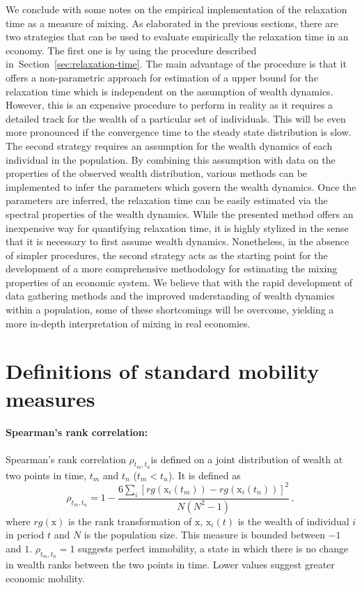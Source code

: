 \documentclass[11pt]{article}
\newcommand{\Sref}[1]{Section~\ref{sec:#1}}
\newcommand{\be}{\begin{equation}}
\newcommand{\ee}{\end{equation}}
\numberwithin{equation}{section}
\begin{document}
We conclude with some notes on the empirical implementation of the relaxation time as a measure of mixing. As elaborated in the previous sections, there are two strategies that can be used to evaluate empirically the relaxation time in an economy. The first one is by using the procedure described in~\Sref{relaxation-time}. The main advantage of the procedure is that it offers a non-parametric approach for estimation of a upper bound for the relaxation time which is independent on the assumption of wealth dynamics. However, this is an expensive procedure to perform in reality as it requires a detailed track for the wealth of a particular set of individuals. This will be even more pronounced if the convergence time to the steady state distribution is slow. The second strategy requires an assumption for the wealth dynamics of each individual in the population. By combining this assumption with data on the properties of the observed wealth distribution, various methods can be implemented to infer the parameters which govern the wealth dynamics. Once the parameters are inferred, the relaxation time can be easily estimated via the spectral properties of the wealth dynamics. While the presented method offers an inexpensive way for quantifying relaxation time, it is highly stylized in the sense that it is necessary to first assume wealth dynamics. Nonetheless, in the absence of simpler procedures, the second strategy acts as the starting point for the development of a more comprehensive methodology for estimating the mixing properties of an economic system. We believe that with the rapid development of data gathering methods and the improved understanding of wealth dynamics within a population, some of these shortcomings will be overcome, yielding a more in-depth interpretation of mixing in real economies.


%

\clearpage

\appendix

\section{Definitions of standard mobility measures}\label{sec:standard-mobility-measures}

\paragraph{Spearman's rank correlation:} Spearman's rank correlation $\rho_{t_m,t_n}$is defined on a joint distribution of wealth at two points in time, $t_m$ and $t_n$ ($t_m < t_n$). It is defined as
%
\be
    \rho_{t_m,t_n} = 1 - \frac{6\sum_i \left[rg\left(\mathrm{x}_i\left(t_m\right)\right) - rg\left(\mathrm{x}_i\left(t_n\right)\right)\right]^2}{N\left(N^2-1\right)}\,,
\ee
%
where $rg(\mathrm{x})$ is the rank transformation of $\mathrm{x}$, $\mathrm{x}_i(t)$ is the wealth of individual $i$ in period $t$ and $N$ is the population size. This measure is bounded between $-1$ and $1$. $\rho_{t_m,t_n} = 1$ suggests perfect immobility, a state in which there is no change in wealth ranks between the two points in time. Lower values suggest greater economic mobility.
\end{document}
